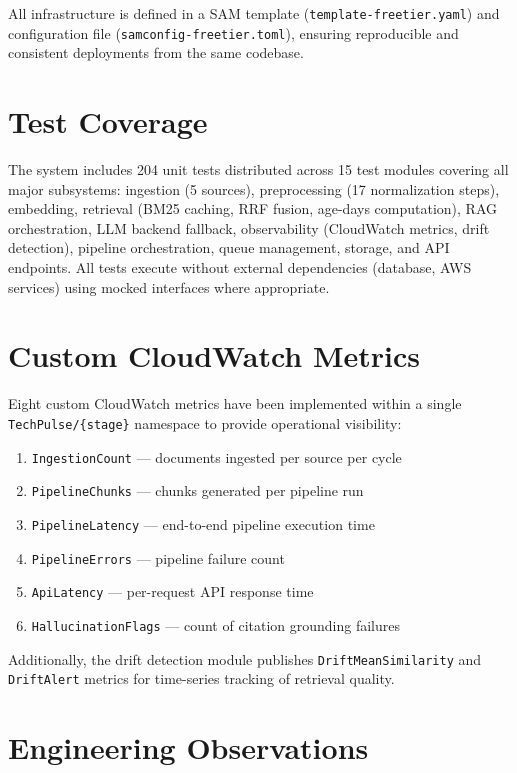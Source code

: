 All infrastructure is defined in a SAM template (\texttt{template-freetier.yaml}) and configuration file (\texttt{samconfig-freetier.toml}), ensuring reproducible and consistent deployments from the same codebase.

\section{Test Coverage}
\label{sec:tests}

The system includes 204 unit tests distributed across 15 test modules covering all major subsystems: ingestion (5 sources), preprocessing (17 normalization steps), embedding, retrieval (BM25 caching, RRF fusion, age-days computation), RAG orchestration, LLM backend fallback, observability (CloudWatch metrics, drift detection), pipeline orchestration, queue management, storage, and API endpoints. All tests execute without external dependencies (database, AWS services) using mocked interfaces where appropriate.

\section{Custom CloudWatch Metrics}
\label{sec:metrics}

Eight custom CloudWatch metrics have been implemented within a single \texttt{TechPulse/\{stage\}} namespace to provide operational visibility:

\begin{enumerate}[leftmargin=0.5in]
  \item \texttt{IngestionCount} --- documents ingested per source per cycle
  \item \texttt{PipelineChunks} --- chunks generated per pipeline run
  \item \texttt{PipelineLatency} --- end-to-end pipeline execution time
  \item \texttt{PipelineErrors} --- pipeline failure count
  \item \texttt{ApiLatency} --- per-request API response time
  \item \texttt{HallucinationFlags} --- count of citation grounding failures
\end{enumerate}

Additionally, the drift detection module publishes \texttt{DriftMeanSimilarity} and \texttt{DriftAlert} metrics for time-series tracking of retrieval quality.

\section{Engineering Observations}
\label{sec:eng_obs}

